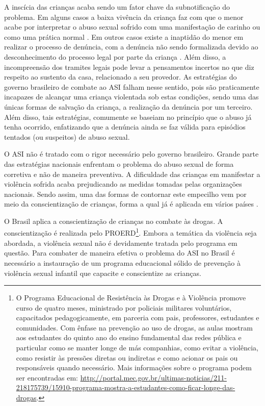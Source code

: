A inscícia das crianças acaba sendo um fator chave da subnotificação do problema. Em alguns casos a baixa vivência da criança faz com que o menor acabe por interpretar o abuso sexual sofrido com uma manifestação de carinho ou como uma prática normal \cite{aded2006abuso}. Em outros casos existe a inaptidão do menor em realizar o processo de denúncia, com a denúncia não sendo formalizada devido ao desconhecimento do processo legal por parte da criança \cite{OMS2002world}. Além disso, a incompreensão dos tramites legais pode levar a pensamentos incertos no que diz respeito ao sustento da casa, relacionado a seu provedor. As estratégias do governo brasileiro de combate ao \ac{ASI} falham nesse sentido, pois são praticamente incapazes de alcançar uma criança violentada sob estas condições, sendo uma das únicas formas de salvação da criança, a realização da denúncia por um terceiro. Além disso, tais estratégias, comumente se baseiam no princípio que o abuso já tenha ocorrido, enfatizando que a denúncia ainda se faz válida para episódios tentados (ou suspeitos) de abuso sexual.

O \ac{ASI} não é tratado com o rigor necessário pelo governo brasileiro. Grande parte das estratégias nacionais enfrentam o problema do abuso sexual de forma corretiva e não de maneira preventiva. A dificuldade das crianças em manifestar a violência sofrida acaba prejudicando as medidas tomadas pelas organizações nacionais. Sendo assim, uma das formas de contornar este empecilho vem por meio da conscientização de crianças, forma a qual já é aplicada em vários países \cite{plummer1999history, muller2014child}.

O Brasil aplica a conscientização de crianças no combate às drogas. A conscientização é realizada pelo \ac{PROERD}\footnote{O Programa Educacional de Resistência às Drogas e à Violência promove curso de quatro meses, ministrado por policiais militares voluntários, capacitados pedagogicamente, em parceria com pais, professores, estudantes e comunidades. Com ênfase na prevenção ao uso de drogas, as aulas mostram aos estudantes do quinto ano do ensino fundamental das redes pública e particular como se manter longe de más companhias, como evitar a violência, como resistir às pressões diretas ou indiretas e como acionar os pais ou responsáveis quando necessário. Mais informações sobre o programa podem ser encontradas em: \url{http://portal.mec.gov.br/ultimas-noticias/211-218175739/15910-programa-mostra-a-estudantes-como-ficar-longe-das-drogas}.}. Embora a temática da violência seja abordada, a violência sexual não é devidamente tratada pelo programa em questão. Para combater de maneira efetiva o problema do \ac{ASI} no Brasil é necessário a instauração de um programa educacional sólido de prevenção à violência sexual infantil que capacite e conscientize as crianças. 

